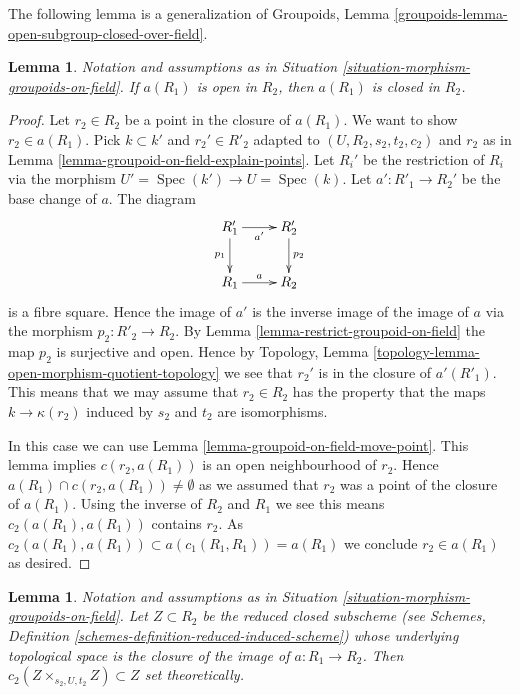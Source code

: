 \documentclass{stacks-project}
\theoremstyle{plain}
\newtheorem{lemma}[subsection]{Lemma}
\theoremstyle{definition}
\theoremstyle{remark}
\numberwithin{equation}{subsection}
\def\Spec{\mathop{\mathrm{Spec}}}
\begin{document}
\noindent
The following lemma is a generalization of
Groupoids, Lemma \ref{groupoids-lemma-open-subgroup-closed-over-field}.

\begin{lemma}
\label{lemma-open-image-is-closed}
Notation and assumptions as in
Situation \ref{situation-morphism-groupoids-on-field}.
If $a(R_1)$ is open in $R_2$, then $a(R_1)$ is closed in $R_2$.
\end{lemma}

\begin{proof}
Let $r_2 \in R_2$ be a point in the closure of $a(R_1)$.
We want to show $r_2 \in a(R_1)$. Pick $k \subset k'$ and
$r_2' \in R'_2$ adapted to $(U, R_2, s_2, t_2, c_2)$ and $r_2$ as in
Lemma \ref{lemma-groupoid-on-field-explain-points}.
Let $R_i'$ be the restriction of $R_i$ via the morphism
$U' = \Spec(k') \to U = \Spec(k)$.
Let $a' : R'_1 \to R_2'$ be the base change of $a$. The diagram
$$
\xymatrix{
R'_1 \ar[r]_{a'} \ar[d]_{p_1} & R'_2 \ar[d]^{p_2} \\
R_1 \ar[r]^a & R_2
}
$$
is a fibre square. Hence the image of $a'$ is the inverse image of
the image of $a$ via the morphism $p_2 : R'_2 \to R_2$. By
Lemma \ref{lemma-restrict-groupoid-on-field}
the map $p_2$ is surjective and open. Hence by
Topology, Lemma \ref{topology-lemma-open-morphism-quotient-topology}
we see that $r_2'$ is in the closure of $a'(R'_1)$.
This means that we may assume that $r_2 \in R_2$ has
the property that the maps $k \to \kappa(r_2)$ induced
by $s_2$ and $t_2$ are isomorphisms.

\medskip\noindent
In this case we can use
Lemma \ref{lemma-groupoid-on-field-move-point}.
This lemma implies $c(r_2, a(R_1))$ is an open neighbourhood of $r_2$.
Hence $a(R_1) \cap c(r_2, a(R_1)) \not = \emptyset$ as we assumed
that $r_2$ was a point of the closure of $a(R_1)$.
Using the inverse of $R_2$ and $R_1$ we see this means
$c_2(a(R_1), a(R_1))$ contains $r_2$.
As $c_2(a(R_1), a(R_1)) \subset a(c_1(R_1, R_1)) = a(R_1)$
we conclude $r_2 \in a(R_1)$ as desired.
\end{proof}

\begin{lemma}
\label{lemma-map-groupoids-on-field-image}
Notation and assumptions as in
Situation \ref{situation-morphism-groupoids-on-field}.
Let $Z \subset R_2$ be the reduced closed subscheme (see
Schemes, Definition \ref{schemes-definition-reduced-induced-scheme})
whose underlying topological space is the closure of the image of
$a : R_1 \to R_2$. Then
$c_2(Z \times_{s_2, U, t_2} Z) \subset Z$
set theoretically.
\end{lemma}
\end{document}
